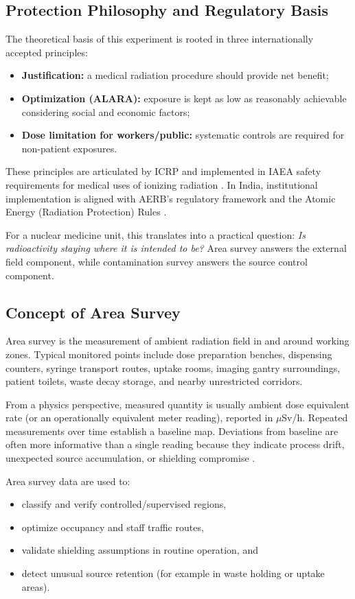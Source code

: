 \subsection{Protection Philosophy and Regulatory Basis}
The theoretical basis of this experiment is rooted in three internationally accepted principles:
\begin{itemize}
    \item \textbf{Justification:} a medical radiation procedure should provide net benefit;
    \item \textbf{Optimization (ALARA):} exposure is kept as low as reasonably achievable considering social and economic factors;
    \item \textbf{Dose limitation for workers/public:} systematic controls are required for non-patient exposures.
\end{itemize}
These principles are articulated by ICRP and implemented in IAEA safety requirements for medical uses of ionizing radiation \cite{icrp103,iaea_gsr3,iaea_ssg46}. In India, institutional implementation is aligned with AERB's regulatory framework and the Atomic Energy (Radiation Protection) Rules \cite{aerb_rpr2004,aerb_publications,aerb_rfsc_2025}.

For a nuclear medicine unit, this translates into a practical question: \textit{Is radioactivity staying where it is intended to be?} Area survey answers the external field component, while contamination survey answers the source control component.

\subsection{Concept of Area Survey}
Area survey is the measurement of ambient radiation field in and around working zones. Typical monitored points include dose preparation benches, dispensing counters, syringe transport routes, uptake rooms, imaging gantry surroundings, patient toilets, waste decay storage, and nearby unrestricted corridors.

From a physics perspective, measured quantity is usually ambient dose equivalent rate (or an operationally equivalent meter reading), reported in $\mu$Sv/h. Repeated measurements over time establish a baseline map. Deviations from baseline are often more informative than a single reading because they indicate process drift, unexpected source accumulation, or shielding compromise \cite{iaea_ssg46,bushberg2011essential}.

Area survey data are used to:
\begin{itemize}
    \item classify and verify controlled/supervised regions,
    \item optimize occupancy and staff traffic routes,
    \item validate shielding assumptions in routine operation, and
    \item detect unusual source retention (for example in waste holding or uptake areas).
\end{itemize}

